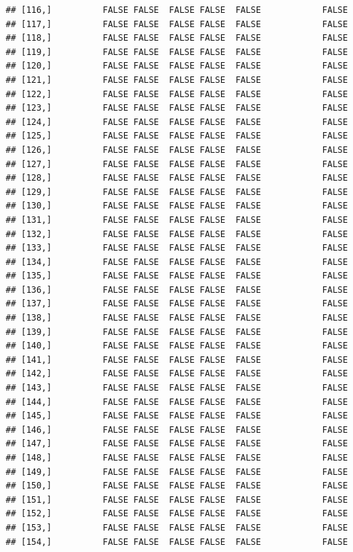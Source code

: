 \documentclass[
  english,
  man,floatsintext]{apa6}
\begin{document}
\begin{verbatim}
## [116,]          FALSE FALSE  FALSE FALSE  FALSE            FALSE
## [117,]          FALSE FALSE  FALSE FALSE  FALSE            FALSE
## [118,]          FALSE FALSE  FALSE FALSE  FALSE            FALSE
## [119,]          FALSE FALSE  FALSE FALSE  FALSE            FALSE
## [120,]          FALSE FALSE  FALSE FALSE  FALSE            FALSE
## [121,]          FALSE FALSE  FALSE FALSE  FALSE            FALSE
## [122,]          FALSE FALSE  FALSE FALSE  FALSE            FALSE
## [123,]          FALSE FALSE  FALSE FALSE  FALSE            FALSE
## [124,]          FALSE FALSE  FALSE FALSE  FALSE            FALSE
## [125,]          FALSE FALSE  FALSE FALSE  FALSE            FALSE
## [126,]          FALSE FALSE  FALSE FALSE  FALSE            FALSE
## [127,]          FALSE FALSE  FALSE FALSE  FALSE            FALSE
## [128,]          FALSE FALSE  FALSE FALSE  FALSE            FALSE
## [129,]          FALSE FALSE  FALSE FALSE  FALSE            FALSE
## [130,]          FALSE FALSE  FALSE FALSE  FALSE            FALSE
## [131,]          FALSE FALSE  FALSE FALSE  FALSE            FALSE
## [132,]          FALSE FALSE  FALSE FALSE  FALSE            FALSE
## [133,]          FALSE FALSE  FALSE FALSE  FALSE            FALSE
## [134,]          FALSE FALSE  FALSE FALSE  FALSE            FALSE
## [135,]          FALSE FALSE  FALSE FALSE  FALSE            FALSE
## [136,]          FALSE FALSE  FALSE FALSE  FALSE            FALSE
## [137,]          FALSE FALSE  FALSE FALSE  FALSE            FALSE
## [138,]          FALSE FALSE  FALSE FALSE  FALSE            FALSE
## [139,]          FALSE FALSE  FALSE FALSE  FALSE            FALSE
## [140,]          FALSE FALSE  FALSE FALSE  FALSE            FALSE
## [141,]          FALSE FALSE  FALSE FALSE  FALSE            FALSE
## [142,]          FALSE FALSE  FALSE FALSE  FALSE            FALSE
## [143,]          FALSE FALSE  FALSE FALSE  FALSE            FALSE
## [144,]          FALSE FALSE  FALSE FALSE  FALSE            FALSE
## [145,]          FALSE FALSE  FALSE FALSE  FALSE            FALSE
## [146,]          FALSE FALSE  FALSE FALSE  FALSE            FALSE
## [147,]          FALSE FALSE  FALSE FALSE  FALSE            FALSE
## [148,]          FALSE FALSE  FALSE FALSE  FALSE            FALSE
## [149,]          FALSE FALSE  FALSE FALSE  FALSE            FALSE
## [150,]          FALSE FALSE  FALSE FALSE  FALSE            FALSE
## [151,]          FALSE FALSE  FALSE FALSE  FALSE            FALSE
## [152,]          FALSE FALSE  FALSE FALSE  FALSE            FALSE
## [153,]          FALSE FALSE  FALSE FALSE  FALSE            FALSE
## [154,]          FALSE FALSE  FALSE FALSE  FALSE            FALSE

\end{verbatim}
\end{document}
